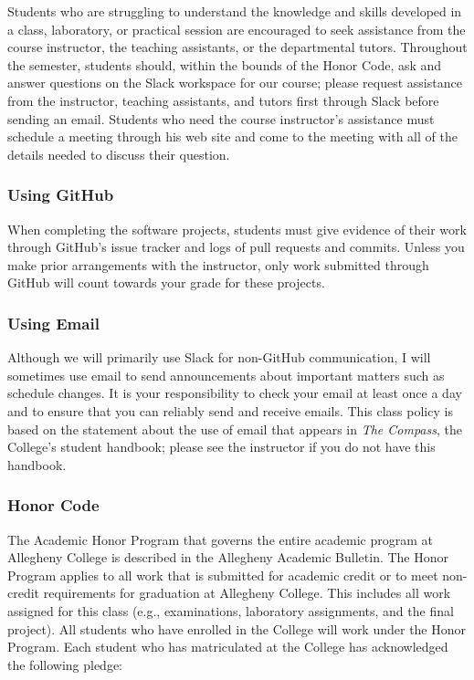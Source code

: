 \documentclass[11pt]{article}
\newcommand{\instructorpronoun}[1]{his}
\begin{document}
Students who are struggling to understand the knowledge and skills developed in
a class, laboratory, or practical session are encouraged to seek assistance from
the course instructor, the teaching assistants, or the departmental tutors.
Throughout the semester, students should, within the bounds of the Honor Code,
ask and answer questions on the Slack workspace for our course; please request
assistance from the instructor, teaching assistants, and tutors first through
Slack before sending an email. Students who need the course instructor's
assistance must schedule a meeting through \instructorpronoun{} web site and
come to the meeting with all of the details needed to discuss their question.

\subsubsection*{Using GitHub}

When completing the software projects, students must give evidence of their work
through GitHub's issue tracker and logs of pull requests and commits. Unless you
make prior arrangements with the instructor, only work submitted through GitHub
will count towards your grade for these projects.

\subsubsection*{Using Email}

Although we will primarily use Slack for non-GitHub communication, I will
sometimes use email to send announcements about important matters such as
schedule changes. It is your responsibility to check your email at least once a
day and to ensure that you can reliably send and receive emails. This class
policy is based on the statement about the use of email that appears in {\em The
Compass}, the College's student handbook; please see the instructor if you do
not have this handbook.

\subsubsection*{Honor Code}

The Academic Honor Program that governs the entire academic program at Allegheny
College is described in the Allegheny Academic Bulletin. The Honor Program
applies to all work that is submitted for academic credit or to meet non-credit
requirements for graduation at Allegheny College. This includes all work
assigned for this class (e.g., examinations, laboratory assignments, and the
final project). All students who have enrolled in the College will work under
the Honor Program. Each student who has matriculated at the College has
acknowledged the following pledge:
\end{document}
